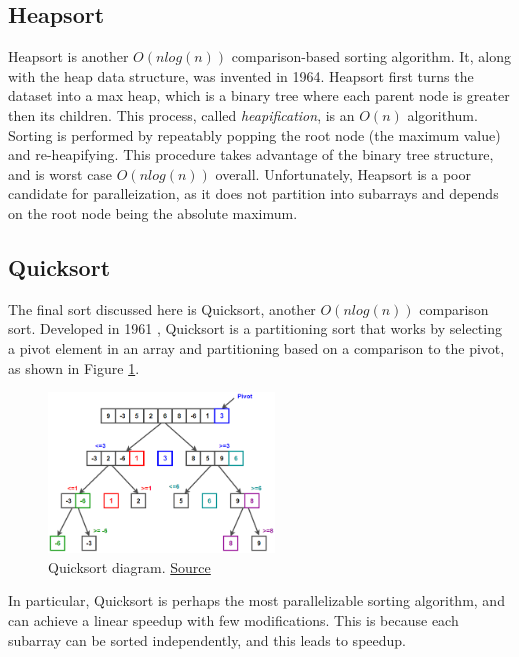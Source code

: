 \documentclass[conference]{IEEEtran}
\begin{document}
    
    \subsection{Heapsort}
    Heapsort is another $O(nlog(n))$ comparison-based sorting algorithm. 
    It, along with the heap data structure, was invented in 1964. \cite{forsythe_algorithms_1964}
    Heapsort first turns the dataset into a max heap, which is a binary tree where each parent node is greater then its children. 
    This process, called \textit{heapification}, is an $O(n)$ algorithum. 
    Sorting is performed by repeatably popping the root node (the maximum value) and re-heapifying. 
    This procedure takes advantage of the binary tree structure, and is worst case $O(n log (n))$ overall.  \cite{cormen_introduction_2009}
    Unfortunately, Heapsort is a poor candidate for paralleization, as it does not partition into subarrays and depends on the root node being the absolute maximum. 
    
    \subsection{Quicksort}
    The final sort discussed here is Quicksort, another $O(n log(n))$ comparison sort. 
    Developed in 1961 \cite{hoare_algorithm_1961}, Quicksort is a partitioning sort that works by selecting a pivot element in an array and partitioning based on a comparison to the pivot, as shown in Figure \ref{qck}. 
    \begin{figure}[h]
        \includegraphics[width=6cm]{Quicksort.png} 
        \caption{Quicksort diagram. \href{https://www.techiedelight.com/quicksort/}{Source}}
        \label{qck}
    \end{figure}
    In particular, Quicksort is perhaps the most parallelizable sorting algorithm, and can achieve a linear speedup with few modifications. \cite{blelloch_programming_1996}
    This is because each subarray can be sorted independently, and this leads to speedup. 
\end{document}
